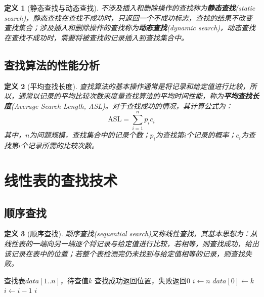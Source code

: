 \documentclass[12pt,a4paper]{amsart}
\newtheorem{definition}{定义}[section]
\begin{document}
\begin{definition}[静态查找与动态查找]
不涉及插入和删除操作的查找称为\textbf{静态查找}(static search)，静态查找在查找不成功时，只返回一个不成功标志，查找的结果不改变查找集合；涉及插入和删除操作的查找称为\textbf{动态查找}(dynamic search)，动态查找在查找不成功时，需要将被查找的记录插入到查找集合中。
\end{definition}

\subsection{查找算法的性能分析}

\begin{definition}[平均查找长度]
查找算法的基本操作通常是将记录和给定值进行比较，所以，通常以记录的平均比较次数来度量查找算法的平均时间性能，称为\textbf{平均查找长度}(Average Search Length, ASL)。对于查找成功的情况，其计算公式为：
\begin{equation}
\text{ASL} = \sum_{i=1}^{n} p_i c_i
\end{equation}
其中，$n$为问题规模，查找集合中的记录个数；$p_i$为查找第$i$个记录的概率；$c_i$为查找第$i$个记录所需的比较次数。
\end{definition}

\section{线性表的查找技术}

\subsection{顺序查找}

\begin{definition}[顺序查找]
顺序查找(sequential search)又称线性查找，其基本思想为：从线性表的一端向另一端逐个将记录与给定值进行比较，若相等，则查找成功，给出该记录在表中的位置；若整个表检测完仍未找到与给定值相等的记录，则查找失败。
\end{definition}

\begin{algorithm}
\caption{顺序查找（带哨兵）}
\begin{algorithmic}[1]
\REQUIRE 查找表$data[1..n]$，待查值$k$
\ENSURE 查找成功返回位置，失败返回0
\STATE $i \leftarrow n$ 
\STATE $data[0] \leftarrow k$ 
    \STATE $i \leftarrow i - 1$
\ENDWHILE
\RETURN $i$
\end{algorithmic}
\end{algorithm}
\end{document}
